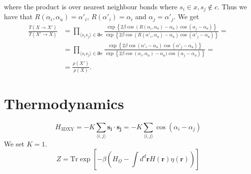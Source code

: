 \documentclass[a4paper]{article}
\newcommand{\trm}[1]{\textrm{#1}}
\begin{document}
where the product is over nearest neighbour bonds where $s_i \in x, s_j \notin c$.
Thus we have that $ R(\alpha_i,\alpha_u) = \alpha'_i $, $R(\alpha'_i) = \alpha_i$ and $\alpha_j = \alpha'_j$.
We get
\begin{align}
  \frac{T(X\rightarrow X')}{T(X'\rightarrow X)}&= \prod_{\langle s_i s_j \rangle \in \bm{\partial} c} \frac{ \exp\left\{2\beta\cos(R(\alpha_i,\alpha_u) - \alpha_u)\cos(\alpha_j - \alpha_u)\right\}}{ \exp\left\{2\beta\cos(R(\alpha'_i,\alpha_u) - \alpha_u)\cos(\alpha'_j -\alpha_u)\right\}} = \\
  &= \prod_{\langle s_i s_j \rangle \in \bm{\partial} c} \frac{ \exp\left\{2\beta\cos(\alpha'_i - \alpha_u)\cos(\alpha'_j - \alpha_u)\right\}}{ \exp\left\{2\beta\cos(\alpha_i,\alpha_u) - \alpha_u)\cos(\alpha_j -\alpha_u)\right\}} = \\
  &= \frac{\rho(X')}{\rho(X)}.
\end{align}

\section{Thermodynamics}
\begin{equation}
  H_{\trm{3DXY}} = -K\sum\limits_{\langle i,j\rangle} \bm{s_i}\cdot\bm{s_j} = -K\sum\limits_{\langle i,j\rangle} \cos(\alpha_i - \alpha_j)
\end{equation}
We set $K=1$.
\begin{equation}
  Z = \trm{Tr} \exp\left[-\beta \left( H_\Omega - \int d^d \bm{r} H(\bm{r})\eta(\bm{r})\right)\right]
\end{equation}
\begin{equation}
  \label{}
\end{equation}
\end{document}
